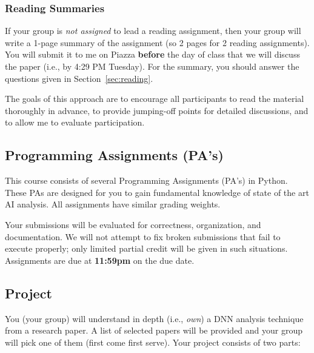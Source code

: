 \documentclass[11pt]{article}
\begin{document}
\subsubsection{Reading Summaries} 

If your group is \emph{not assigned} to lead a reading assignment, then your group will write a 1-page summary of the assignment (so 2 pages for 2 reading assignments). You will submit it to me on Piazza \textbf{before} the day of class that we will discuss the paper (i.e., by 4:29 PM Tuesday).  For the summary, you should answer the questions given in Section~\ref{sec:reading}.

The goals of this approach are to encourage all participants to read the material thoroughly in advance, to provide jumping-off points for detailed discussions, and to allow me to evaluate participation.

\subsection{Programming Assignments (PA's)}

This course consists of several Programming Assignments (PA's) in Python. These PAs are designed for you to gain fundamental knowledge of state of the art AI analysis. All assignments have similar grading weights.

Your submissions will be evaluated for correctness,
organization, and documentation. We will not attempt to fix broken
submissions that fail to execute properly; only limited partial credit will be given in such situations. Assignments are due at \textbf{11:59pm} on the due date.

    

\subsection{Project}
\label{sec:org6da900e}

You (your group) will understand in depth (i.e., \emph{own}) a DNN analysis technique from a research paper. A list of selected papers will be provided and your group will pick one of them (first come first serve).  Your project consists of two parts:
\end{document}
